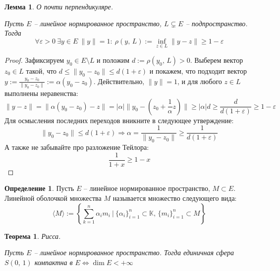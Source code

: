 \documentclass[a4paper,12pt]{article}
\renewcommand{\leq}{\ensuremath{\leqslant}}
\renewcommand{\geq}{\ensuremath{\geqslant}}
\theoremstyle{plain}
\newtheorem{theorem}{Теорема}[section]
\newtheorem{lemma}{Лемма}[section]
\theoremstyle{definition}
\newtheorem{definition}{Определение}[section]
\theoremstyle{remark}
\begin{document}
\begin{lemma}
	О почти перпендикуляре.

	Пусть $E$ -- линейное нормированное пространство, $L \subsetneq E$ -- подпространство. Тогда
	\[
		\forall \varepsilon > 0 \: \exists y \in E \: \|y\| = 1 :\: \rho(y,\, L) := \inf_{z \in L} \|y - z\| \geq 1 - \varepsilon
	\]
\end{lemma}

\begin{proof}
	Зафиксируем $y_0 \in E \setminus L$ и положим $d := \rho(y_0,\, L) > 0$. Выберем вектор $z_0 \in L$ такой, что $d \leq \|y_0 - z_0\| \leq d(1 + \varepsilon)$ и покажем, что подходит вектор $y := \frac{y_0 - z_0}{\|y_0 - z_0\|} := \alpha(y_0 - z_0)$. Действительно, $\|y\| = 1$, и для любого $z \in L$ выполнены неравенства:
	\[
		\|y - z\| = \|\alpha(y_0 - z_0) - z\| = \vert\alpha\vert \|y_0 - \left(z_0 + \frac{1}{\alpha}z\right)\| \geq \vert\alpha\vert d \geq \frac{d}{d(1 + \varepsilon)} \geq 1 - \varepsilon
	\]
	Для осмысления последних переходов вникните в следующее утверждение:
	\[
		\|y_0 - z_0\| \leq d(1 + \varepsilon) \Rightarrow \alpha = \frac{1}{\|y_0 - z_0\|} \geq \frac{1}{d(1 + \varepsilon)}
	\]
	А также не забывайте про разложение Тейлора:
	\[
		\frac{1}{1 + x} \geq 1 - x
	\]
\end{proof}

\begin{definition}
	Пусть $E$ -- линейное нормированное пространство, $M \subset E$. Линейной оболочкой множества $M$ называется множество следующего вида:
	\[
		\langle M\rangle := \left\{\sum_{k = 1}^n\alpha_im_i \:\vert\: \{\alpha_i\}_{i = 1}^n \subset \mathbb{K},\, \{m_i\}_{i = 1}^n \subset M\right\}
	\]
\end{definition}

\begin{theorem}
	Рисса.

	Пусть $E$ -- линейное нормированное пространство. Тогда единичная сфера $S(0,\,1)$ компактна в $E \Leftrightarrow \dim E < +\infty$
\end{theorem}
\end{document}
